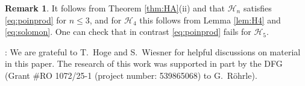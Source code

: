\documentclass[12pt]{amsart}
\newcommand\CH{{\mathscr H}}
\numberwithin{equation}{section}
\theoremstyle{plain}
\theoremstyle{definition}
\newtheorem{remark}[equation]{Remark}
\begin{document}
\begin{remark}
	\label{rem:Hnzeta}
	It follows from Theorem \ref{thm:HA}(ii) and \cite[Prop.~3.4, Thm.~6.1]{jambuparis:factored} that 
	$\CH_n$ satisfies \eqref{eq:poinprod} for $n \le 3$, and for $\CH_4$ this follows from 
	Lemma \ref{lem:H4} and \eqref{eq:solomon}. One can check that in contrast \eqref{eq:poinprod} fails for $\CH_5$.
\end{remark}



\bigskip


: 
We are grateful to T.~Hoge and S.~Wiesner
for helpful discussions on material in this paper.
The research of this work was supported in part by
the DFG (Grant \#RO 1072/25-1 (project number: 539865068) to G.~R\"ohrle).



\bigskip


\end{document}
